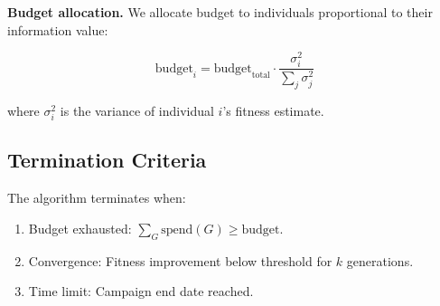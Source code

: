 \textbf{Budget allocation.} We allocate budget to individuals proportional to their information value:

\begin{equation}
\text{budget}_i = \text{budget}_{\text{total}} \cdot \frac{\sigma_i^2}{\sum_j \sigma_j^2}
\end{equation}

where $\sigma_i^2$ is the variance of individual $i$'s fitness estimate.

\subsection{Termination Criteria}

The algorithm terminates when:

\begin{enumerate}
\item Budget exhausted: $\sum_G \text{spend}(G) \geq \text{budget}$.
\item Convergence: Fitness improvement below threshold for $k$ generations.
\item Time limit: Campaign end date reached.
\end{enumerate}

